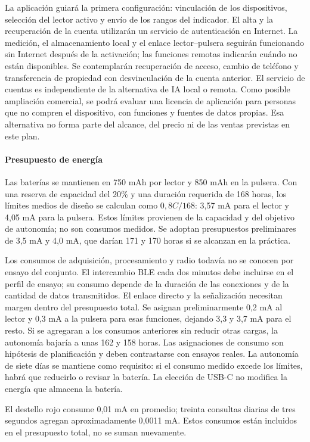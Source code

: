 La aplicación guiará la primera configuración: vinculación de los dispositivos, selección del lector activo y envío de los rangos del indicador. El alta y la recuperación de la cuenta utilizarán un servicio de autenticación en Internet. La medición, el almacenamiento local y el enlace lector--pulsera seguirán funcionando sin Internet después de la activación; las funciones remotas indicarán cuándo no están disponibles. Se contemplarán recuperación de acceso, cambio de teléfono y transferencia de propiedad con desvinculación de la cuenta anterior. El servicio de cuentas es independiente de la alternativa de IA local o remota. Como posible ampliación comercial, se podrá evaluar una licencia de aplicación para personas que no compren el dispositivo, con funciones y fuentes de datos propias. Esa alternativa no forma parte del alcance, del precio ni de las ventas previstas en este plan.

\paragraph{Presupuesto de energía}
Las baterías se mantienen en 750 mAh por lector y 850 mAh en la pulsera. Con una reserva de capacidad del 20\% y una duración requerida de 168 horas, los límites medios de diseño se calculan como $0{,}8C/168$: 3,57 mA para el lector y 4,05 mA para la pulsera. Estos límites provienen de la capacidad y del objetivo de autonomía; no son consumos medidos. Se adoptan presupuestos preliminares de 3,5 mA y 4,0 mA, que darían 171 y 170 horas si se alcanzan en la práctica.

Los consumos de adquisición, procesamiento y radio todavía no se conocen por ensayo del conjunto. El intercambio BLE cada dos minutos debe incluirse en el perfil de ensayo; su consumo depende de la duración de las conexiones y de la cantidad de datos transmitidos. El enlace directo y la señalización necesitan margen dentro del presupuesto total. Se asignan preliminarmente 0,2 mA al lector y 0,3 mA a la pulsera para esas funciones, dejando 3,3 y 3,7 mA para el resto. Si se agregaran a los consumos anteriores sin reducir otras cargas, la autonomía bajaría a unas 162 y 158 horas. Las asignaciones de consumo son hipótesis de planificación y deben contrastarse con ensayos reales. La autonomía de siete días se mantiene como requisito: si el consumo medido excede los límites, habrá que reducirlo o revisar la batería. La elección de USB-C no modifica la energía que almacena la batería.

El destello rojo consume 0,01 mA en promedio; treinta consultas diarias de tres segundos agregan aproximadamente 0,0011 mA. Estos consumos están incluidos en el presupuesto total, no se suman nuevamente.

